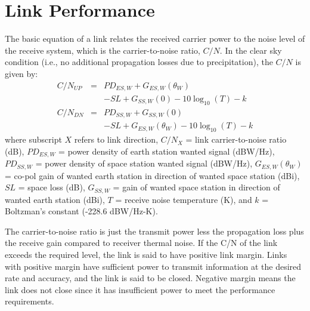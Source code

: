 \documentclass[11pt]{article}
\begin{document}
\section{Link Performance}

The basic equation of a link relates the received carrier power to the
noise level of the receive system, which is the carrier-to-noise
ratio, $C/N$.  In the clear sky condition (i.e., no additional
propagation losses due to precipitation), the $C/N$ is given by:
\begin{eqnarray}
  C / N_{UP} &=& PD_{ES,W} + G_{ES,W}(\theta_W) \nonumber \\
  && - SL + G_{SS,W}(0) - 10\log_{10}(T) - k \\
  C / N_{DN} &=& PD_{SS,W} + G_{SS,W}(0) \nonumber \\
  && - SL + G_{ES,W}(\theta_W) - 10\log_{10}(T) - k
\end{eqnarray}
where subscript $X$ refers to link direction, $C/N_{X}$ = link
carrier-to-noise ratio (dB), $PD_{ES,W}$ = power density of earth
station wanted signal (dBW/Hz), $PD_{SS,W}$ = power density of space
station wanted signal (dBW/Hz), $G_{ES,W}(\theta_W)$ = co-pol gain of
wanted earth station in direction of wanted space station (dBi), $SL$
= space loss (dB), $G_{SS,W}$ = gain of wanted space station in
direction of wanted earth station (dBi), $T$ = receive noise
temperature (K), and $k$ = Boltzman’s constant (-228.6 dBW/Hz-K).

The carrier-to-noise ratio is just the transmit power less the
propagation loss plus the receive gain compared to receiver thermal
noise.  If the C/N of the link exceeds the required level, the link is
said to have positive link margin.  Links with positive margin have
sufficient power to transmit information at the desired rate and
accuracy, and the link is said to be closed.  Negative margin means
the link does not close since it has insufficient power to meet the
performance requirements.
\end{document}

